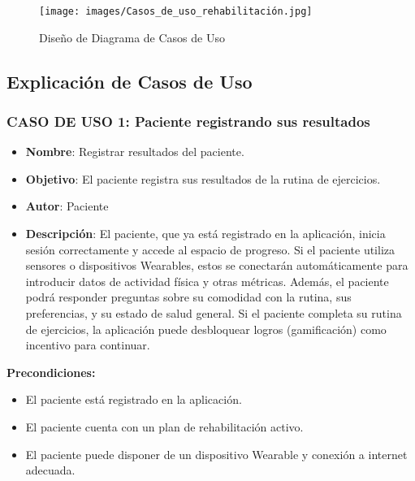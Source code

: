 \documentclass{article}
\begin{document}
\begin{figure}[h!]
	\begin{center} 
		\texttt{[image: images/Casos\_de\_uso\_rehabilitación.jpg]}
		\caption{Diseño de Diagrama de Casos de Uso}
		\label{fig:requisitos_diagrama}
	\end{center}
\end{figure}

\subsection{Explicación de Casos de Uso}

\subsubsection*{CASO DE USO 1: Paciente registrando sus resultados}

\begin{itemize}
	\item \textbf{Nombre}: Registrar resultados del paciente.
	\item \textbf{Objetivo}: El paciente registra sus resultados de la rutina de ejercicios.
	\item \textbf{Autor}: Paciente
	\item \textbf{Descripción}: 
	El paciente, que ya está registrado en la aplicación, inicia sesión correctamente y accede al espacio de progreso. Si el paciente utiliza sensores o dispositivos Wearables, estos se conectarán automáticamente para introducir datos de actividad física y otras métricas. Además, el paciente podrá responder preguntas sobre su comodidad con la rutina, sus preferencias, y su estado de salud general. Si el paciente completa su rutina de ejercicios, la aplicación puede desbloquear logros (gamificación) como incentivo para continuar.
\end{itemize}

\textbf{Precondiciones:}
\begin{itemize}
	\item El paciente está registrado en la aplicación.
	\item El paciente cuenta con un plan de rehabilitación activo.
	\item El paciente puede disponer de un dispositivo Wearable y conexión a internet adecuada.
\end{itemize}
\end{document}

